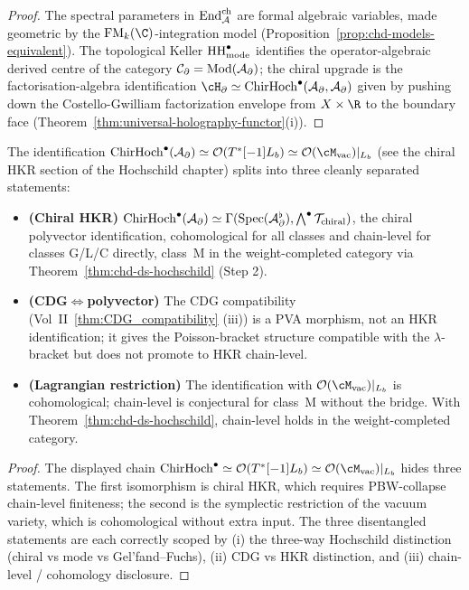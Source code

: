 \begin{proof}
The spectral parameters in $\mathrm{End}^{\mathrm{ch}}_{\mathcal{A}}$ are
formal algebraic variables, made geometric by the
$\FM_k(\C)$-integration model
(Proposition~\ref*{prop:chd-models-equivalent}). The
topological Keller $\mathrm{HH}^\bullet_{\mathrm{mode}}$ identifies the
operator-algebraic derived centre of the category
$\mathcal{C}_\partial = \mathrm{Mod}(\mathcal{A}_\partial)$; the chiral upgrade is the
factorisation-algebra identification
$\cH_\partial \simeq \ChirHoch^\bullet(\cA_\partial, \cA_\partial)$
given by pushing down the Costello-Gwilliam factorization envelope
from $X \times \R$ to the boundary face
(Theorem~\ref{thm:universal-holography-functor}(i)).
\end{proof}

\begin{proposition}
\label{prop:uhf-hkr-disentangled}
The identification
$\ChirHoch^\bullet(\cA_\partial) \simeq \cO(T^*[-1] L_b)
\simeq \cO(\cM_{\mathrm{vac}})|_{L_b}$
(see the chiral HKR section of the Hochschild chapter)
splits into three cleanly
separated statements:
\begin{itemize}
\item \textbf{(Chiral HKR)} $\mathrm{ChirHoch}^\bullet(\mathcal{A}_\partial)
 \simeq \Gamma(\mathrm{Spec}(\mathcal{A}_\partial^\flat),
 \bigwedge^\bullet \mathcal{T}_{\mathrm{chiral}})$, the chiral
 polyvector identification, cohomological for all classes and
 chain-level for classes G/L/C directly, class~M in the
 weight-completed category via
 Theorem~\ref*{thm:chd-ds-hochschild} \textup{(}Step 2\textup{)}.
\item \textbf{(CDG$\Leftrightarrow$polyvector)} The CDG
 compatibility \textup{(}Vol~II~\ref*{thm:CDG_compatibility}%
 \textup{(iii)}\textup{)} is a PVA morphism, not an HKR identification;
 it gives the Poisson-bracket structure compatible with the
 $\lambda$-bracket but does not promote to HKR chain-level.
\item \textbf{(Lagrangian restriction)} The identification with
 $\cO(\cM_{\mathrm{vac}})|_{L_b}$ is cohomological;
 chain-level is conjectural for class~M without the bridge. With
 Theorem~\ref*{thm:chd-ds-hochschild}, chain-level holds in the
 weight-completed category.
\end{itemize}
\end{proposition}

\begin{proof}
The displayed chain
$\ChirHoch^\bullet \simeq \cO(T^*[-1] L_b) \simeq
\cO(\cM_{\mathrm{vac}})|_{L_b}$ hides three statements. The first
isomorphism is chiral
HKR, which requires PBW-collapse chain-level finiteness; the
second is the symplectic restriction of the vacuum variety, which
is cohomological without extra input. The three disentangled
statements are each correctly scoped by (i) the three-way
Hochschild distinction (chiral vs mode vs Gel'fand--Fuchs),
(ii) CDG vs HKR distinction, and (iii) chain-level / cohomology
disclosure.
\end{proof}

